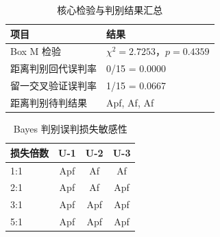 \begin{table}[H]
    \centering
    \caption{核心检验与判别结果汇总}
    \label{tab:core_summary}
    \renewcommand{\arraystretch}{1.25}
    \begin{tabular}{lp{9.2cm}}
        \toprule
        项目 & 结果 \\
        \midrule
        Box M 检验 & $\chi^2=2.7253$，$p=0.4359$ \\
距离判别回代误判率 & 0/15 = 0.0000 \\
留一交叉验证误判率 & 1/15 = 0.0667 \\
距离判别待判结果 & Apf, Af, Af \\
        \bottomrule
    \end{tabular}
\end{table}

\begin{table}[H]
    \centering
    \caption{Bayes 判别误判损失敏感性}
    \label{tab:bayes_sensitivity}
    \renewcommand{\arraystretch}{1.25}
    \begin{tabular}{lccc}
        \toprule
        损失倍数 & U-1 & U-2 & U-3 \\
        \midrule
        1:1 & Apf & Af & Af \\
2:1 & Apf & Af & Apf \\
3:1 & Apf & Apf & Apf \\
5:1 & Apf & Apf & Apf \\
        \bottomrule
    \end{tabular}
\end{table}
